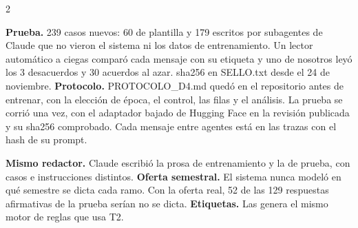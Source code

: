 \documentclass[9pt,a4paper]{extarticle}
\newcommand{\seccion}[1]{\vspace{0.6mm}{\bfseries\footnotesize\color{acento}\MakeUppercase{#1}}\par\nobreak\vspace{0.4mm}\nobreak}
\newcommand{\q}{\textquotedbl}
\newcommand{\cod}[1]{{\ttfamily\small #1}}
\begin{document}
\begin{multicols}{2}
{\footnotesize
\textbf{Prueba.} 239 casos nuevos: 60 de plantilla y 179 escritos por subagentes de Claude que
no vieron el sistema ni los datos de entrenamiento. Un lector automático a ciegas comparó cada
mensaje con su etiqueta y uno de nosotros leyó los 3 desacuerdos y 30 acuerdos al azar. sha256
en \cod{SELLO.txt} desde el 24 de noviembre. \textbf{Protocolo.} \cod{PROTOCOLO\_D4.md} quedó en
el repositorio antes de entrenar, con la elección de época, el control, las filas y el análisis.
La prueba se corrió una vez, con el adaptador bajado de Hugging Face en la revisión publicada y
su sha256 comprobado. Cada mensaje entre agentes está en las trazas con el hash de su prompt.\par}

\seccion{Límites declarados}

{\footnotesize
\textbf{Mismo redactor.} Claude escribió la prosa de entrenamiento y la de prueba, con casos e
instrucciones distintos. \textbf{Oferta semestral.} El sistema nunca modeló en qué semestre se
dicta cada ramo. Con la oferta real, 52 de las 129 respuestas afirmativas de la prueba serían
\q no se dicta\q. \textbf{Etiquetas.} Las genera el mismo motor de reglas que usa T2.\par}

\end{multicols}
\end{document}
